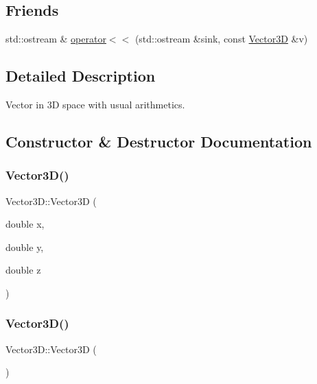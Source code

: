 \subsection*{Friends}
\begin{DoxyCompactItemize}
\item 
std\+::ostream \& \mbox{\hyperlink{classVector3D_a63f31894e510c707624cd63bafd31487}{operator$<$$<$}} (std\+::ostream \&sink, const \mbox{\hyperlink{classVector3D}{Vector3D}} \&v)
\end{DoxyCompactItemize}


\subsection{Detailed Description}
Vector in 3D space with usual arithmetics. 

\subsection{Constructor \& Destructor Documentation}
\mbox{\label{classVector3D_abd851542da40b1168edcad11fa83b7c2}} 
\subsubsection{\texorpdfstring{Vector3D()}{Vector3D()}\hspace{0.1cm}{\footnotesize\ttfamily [1/2]}}
{\footnotesize\ttfamily Vector3\+D\+::\+Vector3D (\begin{DoxyParamCaption}\item[{double}]{x,  }\item[{double}]{y,  }\item[{double}]{z }\end{DoxyParamCaption})}

\mbox{\label{classVector3D_a0b11a8d75da427b27443d8a94d0d296c}} 
\subsubsection{\texorpdfstring{Vector3D()}{Vector3D()}\hspace{0.1cm}{\footnotesize\ttfamily [2/2]}}
{\footnotesize\ttfamily Vector3\+D\+::\+Vector3D (\begin{DoxyParamCaption}{ }\end{DoxyParamCaption})}



